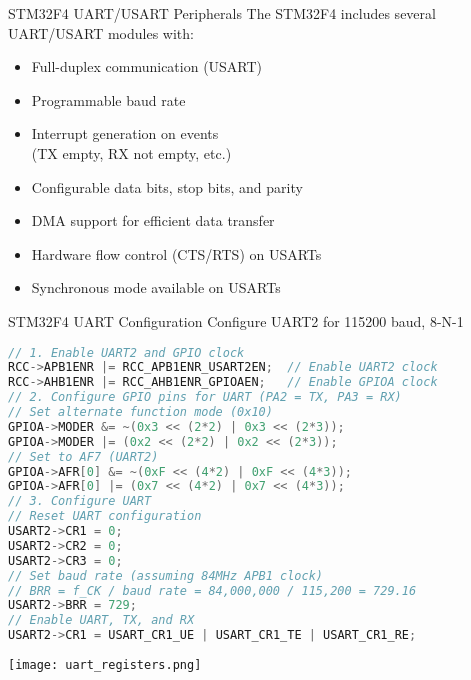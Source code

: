\begin{concept}{STM32F4 UART/USART Peripherals}
The STM32F4 includes several UART/USART modules with:

\begin{minipage}{0.5\linewidth}
\begin{itemize}
    \item Full-duplex communication (USART)
    \item Programmable baud rate
    \item Interrupt generation on events \\ (TX empty, RX not empty, etc.)
    \end{itemize}
\end{minipage}
\begin{minipage}{0.5\linewidth}
\begin{itemize}
    \item Configurable data bits, stop bits, and parity
    \item DMA support for efficient data transfer
    \item Hardware flow control (CTS/RTS) on USARTs
    \item Synchronous mode available on USARTs
\end{itemize}
\end{minipage}
\end{concept}

\begin{code}{STM32F4 UART Configuration} Configure UART2 for 115200 baud, 8-N-1
\begin{lstlisting}[language=C, style=basesmol]
// 1. Enable UART2 and GPIO clock
RCC->APB1ENR |= RCC_APB1ENR_USART2EN;  // Enable UART2 clock
RCC->AHB1ENR |= RCC_AHB1ENR_GPIOAEN;   // Enable GPIOA clock
// 2. Configure GPIO pins for UART (PA2 = TX, PA3 = RX)
// Set alternate function mode (0x10)
GPIOA->MODER &= ~(0x3 << (2*2) | 0x3 << (2*3));
GPIOA->MODER |= (0x2 << (2*2) | 0x2 << (2*3));
// Set to AF7 (UART2)
GPIOA->AFR[0] &= ~(0xF << (4*2) | 0xF << (4*3));
GPIOA->AFR[0] |= (0x7 << (4*2) | 0x7 << (4*3));
// 3. Configure UART
// Reset UART configuration
USART2->CR1 = 0;
USART2->CR2 = 0;
USART2->CR3 = 0;
// Set baud rate (assuming 84MHz APB1 clock)
// BRR = f_CK / baud rate = 84,000,000 / 115,200 = 729.16
USART2->BRR = 729;
// Enable UART, TX, and RX
USART2->CR1 = USART_CR1_UE | USART_CR1_TE | USART_CR1_RE;
\end{lstlisting}
\end{code}

\texttt{[image: uart\_registers.png]}

